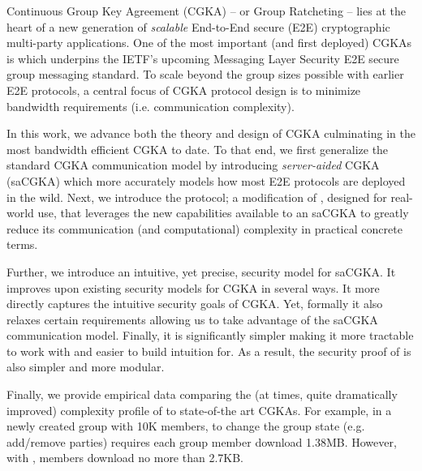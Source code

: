 
Continuous Group Key Agreement (CGKA) -- or Group Ratcheting -- lies at the
heart of a new generation of \emph{scalable} End-to-End secure (E2E)
cryptographic multi-party applications. One of the most important (and first
deployed) CGKAs is \protITK which underpins the IETF's upcoming Messaging
Layer Security E2E secure group messaging standard. To scale beyond the group
sizes possible with earlier E2E protocols, a central focus of CGKA protocol
design is to minimize bandwidth requirements (i.e. communication
complexity).

In this work, we advance both the theory and design of CGKA culminating in
the most bandwidth efficient CGKA to date. To that end, we first generalize
the standard CGKA communication model by introducing \emph{server-aided} CGKA
(saCGKA) which more accurately models how most E2E protocols are deployed in
the wild. Next, we introduce the \saik protocol; a modification of \protITK,
designed for real-world use, that leverages the new capabilities available to
an saCGKA to greatly reduce its communication (and computational) complexity
in practical concrete terms.

Further, we introduce an intuitive, yet precise, security model for saCGKA.
It improves upon existing security models for CGKA in several ways. It more
directly captures the intuitive security goals of CGKA. Yet, formally it also
relaxes certain requirements allowing us to take advantage of the saCGKA
communication model. Finally, it is significantly simpler making it more
tractable to work with and easier to build intuition for. As a result, the
security proof of \saik is also simpler and more modular.

Finally, we provide empirical data comparing the (at times, quite
dramatically improved) complexity profile of \saik to state-of-the art CGKAs.
For example, in a newly created group with 10K members, to change the group
state (e.g. add/remove parties) \protITK requires each group member download
1.38MB. However, with \saik, members download no more than 2.7KB.

